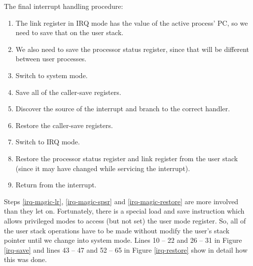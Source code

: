 \documentclass[12pt]{article}
\begin{document}
\pagebreak

\noindent
The final interrupt handling procedure:
\begin{enumerate}
\item \label{irq-magic-lr}The link register in IRQ mode has the value of the
    active process' PC, so we need to save that on the user stack.
\item \label{irq-magic-spsr}We also need to save the processor status register,
    since that will be different between user processes. 
\item Switch to system mode.
\item Save all of the caller-save registers.
\item Discover the source of the interrupt and branch to the correct handler.
\item Restore the caller-save registers.
\item Switch to IRQ mode.
\item \label{irq-magic-restore}Restore the processor status register and link
    register from the user stack (since it may have changed while servicing the
    interrupt).
\item Return from the interrupt.
\end{enumerate}

Steps \ref{irq-magic-lr}, \ref{irq-magic-spsr} and \ref{irq-magic-restore}
are more involved than they let on. Fortunately, there is a special load and
save instruction which allows privileged modes to access (but not set) the user
mode register. So, all of the user stack operations have to be made without
modify the user's stack pointer until we change into system mode. Lines 10 \---
22 and 26 \--- 31 in Figure \ref{irq-save} and lines 43 \--- 47 and 52 \--- 65
in Figure \ref{irq-restore} show in detail how this was done.
\end{document}
